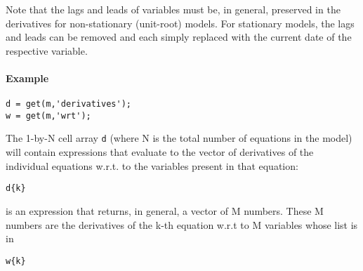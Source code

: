 Note that the lags and leads of variables must be, in general, preserved
in the derivatives for non-stationary (unit-root) models. For stationary
models, the lags and leads can be removed and each simply replaced with
the current date of the respective variable.

\paragraph{Example}

\begin{verbatim}
d = get(m,'derivatives');
w = get(m,'wrt');
\end{verbatim}

The 1-by-N cell array \texttt{d} (where N is the total number of
equations in the model) will contain expressions that evaluate to the
vector of derivatives of the individual equations w.r.t. to the
variables present in that equation:

\begin{verbatim}
d{k}
\end{verbatim}

is an expression that returns, in general, a vector of M numbers. These
M numbers are the derivatives of the k-th equation w.r.t to M variables
whose list is in

\begin{verbatim}
w{k}
\end{verbatim}


